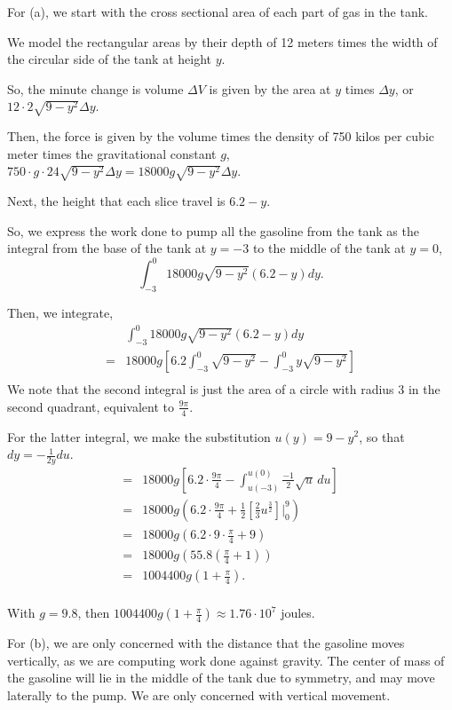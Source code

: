 \documentclass[../hw7]{subfiles}
\begin{document}
For (a), we start with the cross sectional area of each part of gas in the tank. 

We model the rectangular areas by their depth of 12 meters times the width of the circular side of the tank at height $y$.

So, the minute change is volume $\Delta V$ is given by the area at $y$ times $\Delta y$, or $12\cdot2\sqrt{9-y^2}\Delta y$.

Then, the force is given by the volume times the density of 750 kilos per cubic meter times the gravitational constant $g$, $750\cdot g\cdot24\sqrt{9-y^2}\Delta y=18000g\sqrt{9-y^2} \Delta y$.

Next, the height that each slice travel is $6.2-y$.

So, we express the work done to pump all the gasoline from the tank as the integral from the base of the tank at $y=-3$ to the middle of the tank at $y=0$,
\[\int_{-3}^{0} 18000g\sqrt{9-y^2}(6.2-y)dy.\]

Then, we integrate,
\begin{align*}
    &\int_{-3}^{0} 18000g\sqrt{9-y^2}(6.2-y)dy \\
    =& 18000g\left[ 6.2\int_{-3}^{0}\sqrt{9-y^2} - \int_{-3}^{0}y\sqrt{9-y^2} \right] \\
\end{align*}
We note that the second integral is just the area of a circle with radius 3 in the second quadrant, equivalent to $\frac{9\pi}{4}$.

For the latter integral, we make the substitution $u(y)=9-y^2$, so that $dy=-\frac{1}{2y}du$.
\begin{align*}
    =& 18000g\left[ 6.2\cdot\frac{9\pi}{4} - \int_{u(-3)}^{u(0)} \frac{-1}{2} \sqrt{u}\,du\right] \\
    =& 18000g\left( 6.2\cdot\frac{9\pi}{4} + \frac{1}{2} \left[ \frac{2}{3}u^{\frac{3}{2}} \right] \Bigg\vert_{0}^{9} \right) \\
    =& 18000g\left( 6.2\cdot9\cdot\frac{\pi}{4} + 9 \right) \\
    =& 18000g\left( 55.8\left( \frac{\pi}{4}+1 \right) \right) \\
    =& 1004400g\left( 1+\frac{\pi}{4} \right). \\
\end{align*}

With $g=9.8$, then $1004400g\left( 1+\frac{\pi}{4} \right) \approx 1.76\cdot10^7$ joules.


For (b), we are only concerned with the distance that the gasoline moves vertically, as we are computing work done against gravity. The center of mass of the gasoline will lie in the middle of the tank due to symmetry, and may move laterally to the pump. We are only concerned with vertical movement.
\end{document}
